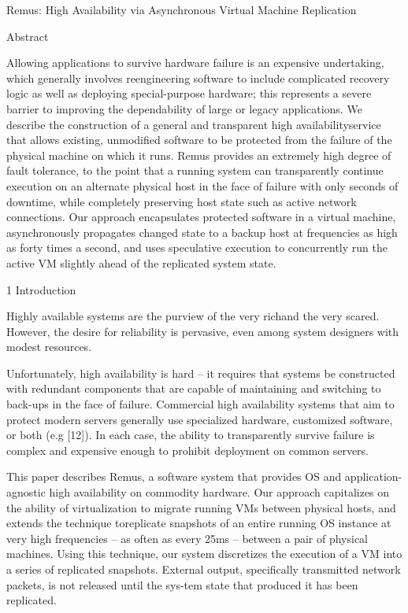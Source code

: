 
Remus: High Availability via Asynchronous Virtual Machine Replication

Abstract

Allowing applications to survive hardware failure is an expensive undertaking,
which generally involves reengineering software to include complicated
recovery logic as well as deploying special-purpose hardware; this represents a
severe barrier to improving the dependability of large or legacy applications.
We describe the construction of a general and transparent high
availabilityservice that allows existing, unmodified software to be protected
from the failure of the physical machine on which it runs. 
Remus provides an extremely high degree of fault tolerance, to the point that a
running system can transparently continue execution on an alternate physical
host in the face of failure with only seconds of downtime, while completely
preserving host state such as active network connections. 
Our approach encapsulates protected software in a virtual machine,
asynchronously propagates changed state to a backup host at frequencies as high
as forty times a second, and uses speculative execution to concurrently run
the active VM slightly ahead of the replicated system state.

1 Introduction

Highly available systems are the purview of the very richand the very scared.
However, the desire for reliability is pervasive, even among system designers
with modest resources.

Unfortunately, high availability is hard -- it requires that systems be
constructed with redundant components that are capable of maintaining and
switching to back-ups in the face of failure. 
Commercial high availability systems that aim to protect modern servers
generally use specialized hardware, customized software, or both (e.g [12]). 
In each case, the ability to transparently survive failure is complex and
expensive enough to prohibit deployment on common servers.

This paper describes Remus, a software system that provides OS and
application-agnostic high availability on commodity hardware. 
Our approach capitalizes on the ability of virtualization to migrate running VMs
between physical hosts, and extends the technique toreplicate snapshots of
an entire running OS instance at very high frequencies -- as often as every
25ms -- between a pair of physical machines. 
Using this technique, our system discretizes the execution of a VM into a
series of replicated snapshots. 
External output, specifically transmitted network packets, is not released
until the sys-tem state that produced it has been replicated.

